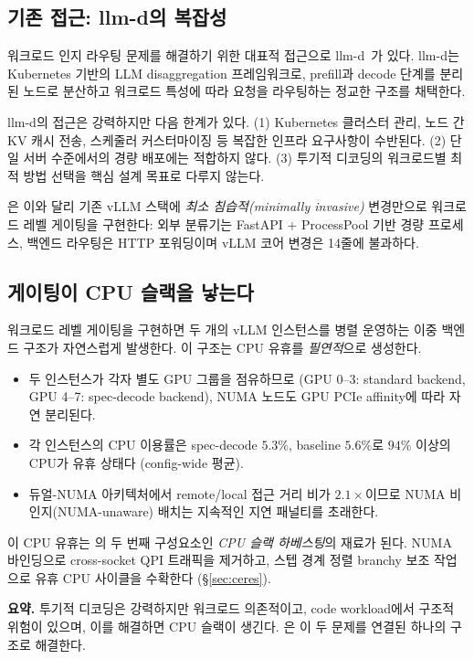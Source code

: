 \subsection{기존 접근: llm-d의 복잡성}
\label{subsec:mot-llmd}

워크로드 인지 라우팅 문제를 해결하기 위한 대표적 접근으로
llm-d~\cite{llmd2025}가 있다.
llm-d는 Kubernetes 기반의 LLM disaggregation 프레임워크로,
prefill과 decode 단계를 분리된 노드로 분산하고
워크로드 특성에 따라 요청을 라우팅하는 정교한 구조를 채택한다.


llm-d의 접근은 강력하지만 다음 한계가 있다.
(1) Kubernetes 클러스터 관리, 노드 간 KV 캐시 전송, 스케줄러 커스터마이징 등
복잡한 인프라 요구사항이 수반된다.
(2) 단일 서버 수준에서의 경량 배포에는 적합하지 않다.
(3) 투기적 디코딩의 워크로드별 최적 방법 선택을
핵심 설계 목표로 다루지 않는다.

\algname 은 이와 달리 기존 vLLM 스택에 \emph{최소 침습적(minimally invasive)} 변경만으로
워크로드 레벨 게이팅을 구현한다:
외부 분류기는 FastAPI + ProcessPool 기반 경량 프로세스,
백엔드 라우팅은 HTTP 포워딩이며 vLLM 코어 변경은 14줄에 불과하다.

\subsection{게이팅이 CPU 슬랙을 낳는다}
\label{subsec:mot-cpu-slack}

워크로드 레벨 게이팅을 구현하면 두 개의 vLLM 인스턴스를 병렬 운영하는
이중 백엔드 구조가 자연스럽게 발생한다.
이 구조는 CPU 유휴를 \emph{필연적}으로 생성한다.

\begin{itemize}
\item 두 인스턴스가 각자 별도 GPU 그룹을 점유하므로
  (GPU 0--3: standard backend, GPU 4--7: spec-decode backend),
  NUMA 노드도 GPU PCIe affinity에 따라 자연 분리된다.
\item 각 인스턴스의 CPU 이용률은 spec-decode $5.3\%$, baseline $5.6\%$로
  $94\%$ 이상의 CPU가 유휴 상태다 (config-wide 평균).
\item 듀얼-NUMA 아키텍처에서 remote/local 접근 거리 비가 $2.1\times$이므로
  NUMA 비인지(NUMA-unaware) 배치는 지속적인 지연 패널티를 초래한다.
\end{itemize}

이 CPU 유휴는 \algname 의 두 번째 구성요소인 \emph{CPU 슬랙 하베스팅}의
재료가 된다.
NUMA 바인딩으로 cross-socket QPI 트래픽을 제거하고,
스텝 경계 정렬 branchy 보조 작업으로 유휴 CPU 사이클을 수확한다
(\S\ref{sec:ceres}).

\textbf{요약.}
투기적 디코딩은 강력하지만 워크로드 의존적이고, code workload에서 구조적 위험이 있으며,
이를 해결하면 CPU 슬랙이 생긴다.
\algname 은 이 두 문제를 연결된 하나의 구조로 해결한다.
